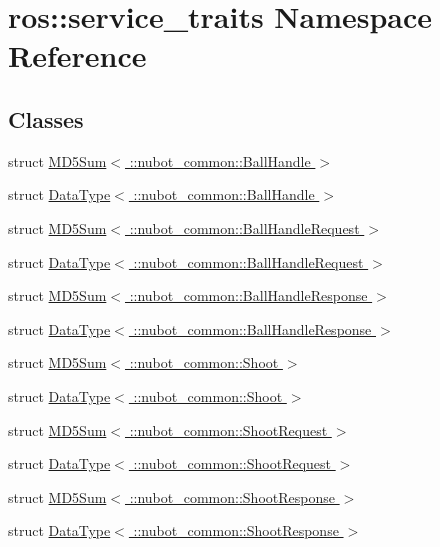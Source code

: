 \hypertarget{namespaceros_1_1service__traits}{\section{ros\-:\-:service\-\_\-traits Namespace Reference}
\label{namespaceros_1_1service__traits}
}
\subsection*{Classes}
\begin{DoxyCompactItemize}
\item 
struct \hyperlink{structros_1_1service__traits_1_1MD5Sum_3_01_1_1nubot__common_1_1BallHandle_01_4}{M\-D5\-Sum$<$ \-::nubot\-\_\-common\-::\-Ball\-Handle $>$}
\item 
struct \hyperlink{structros_1_1service__traits_1_1DataType_3_01_1_1nubot__common_1_1BallHandle_01_4}{Data\-Type$<$ \-::nubot\-\_\-common\-::\-Ball\-Handle $>$}
\item 
struct \hyperlink{structros_1_1service__traits_1_1MD5Sum_3_01_1_1nubot__common_1_1BallHandleRequest_01_4}{M\-D5\-Sum$<$ \-::nubot\-\_\-common\-::\-Ball\-Handle\-Request $>$}
\item 
struct \hyperlink{structros_1_1service__traits_1_1DataType_3_01_1_1nubot__common_1_1BallHandleRequest_01_4}{Data\-Type$<$ \-::nubot\-\_\-common\-::\-Ball\-Handle\-Request $>$}
\item 
struct \hyperlink{structros_1_1service__traits_1_1MD5Sum_3_01_1_1nubot__common_1_1BallHandleResponse_01_4}{M\-D5\-Sum$<$ \-::nubot\-\_\-common\-::\-Ball\-Handle\-Response $>$}
\item 
struct \hyperlink{structros_1_1service__traits_1_1DataType_3_01_1_1nubot__common_1_1BallHandleResponse_01_4}{Data\-Type$<$ \-::nubot\-\_\-common\-::\-Ball\-Handle\-Response $>$}
\item 
struct \hyperlink{structros_1_1service__traits_1_1MD5Sum_3_01_1_1nubot__common_1_1Shoot_01_4}{M\-D5\-Sum$<$ \-::nubot\-\_\-common\-::\-Shoot $>$}
\item 
struct \hyperlink{structros_1_1service__traits_1_1DataType_3_01_1_1nubot__common_1_1Shoot_01_4}{Data\-Type$<$ \-::nubot\-\_\-common\-::\-Shoot $>$}
\item 
struct \hyperlink{structros_1_1service__traits_1_1MD5Sum_3_01_1_1nubot__common_1_1ShootRequest_01_4}{M\-D5\-Sum$<$ \-::nubot\-\_\-common\-::\-Shoot\-Request $>$}
\item 
struct \hyperlink{structros_1_1service__traits_1_1DataType_3_01_1_1nubot__common_1_1ShootRequest_01_4}{Data\-Type$<$ \-::nubot\-\_\-common\-::\-Shoot\-Request $>$}
\item 
struct \hyperlink{structros_1_1service__traits_1_1MD5Sum_3_01_1_1nubot__common_1_1ShootResponse_01_4}{M\-D5\-Sum$<$ \-::nubot\-\_\-common\-::\-Shoot\-Response $>$}
\item 
struct \hyperlink{structros_1_1service__traits_1_1DataType_3_01_1_1nubot__common_1_1ShootResponse_01_4}{Data\-Type$<$ \-::nubot\-\_\-common\-::\-Shoot\-Response $>$}
\end{DoxyCompactItemize}
